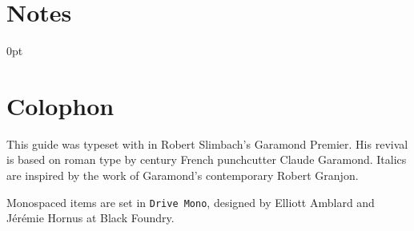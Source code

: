 \backmatter


\chapter{Notes}


\newlength{\enotewidth}
\settowidth{\enotewidth}{00.\enspace}

\renewcommand\enoteheading{}
\renewcommand\makeenmark{\theenmark.\enspace}
\renewcommand\enotesize{\normalsize}
\renewcommand\enoteformat{\leavevmode\llap{\makeenmark}}
\begin{adjustwidth}{\enotewidth}{0pt}
\raggedright
\theendnotes
\end{adjustwidth}

{\let\cleardoublepage\clearpage \chapter{Colophon}}

This guide was typeset with \LuaLaTeX{} in Robert Slimbach's Garamond Premier.
His revival is based on roman type by
 century French
punchcutter Claude Garamond.
Italics are inspired by the work of Garamond's contemporary Robert Granjon.

Monospaced items are set in \texttt{Drive Mono},
designed by Elliott Amblard and Jérémie Hornus at Black Foundry.

